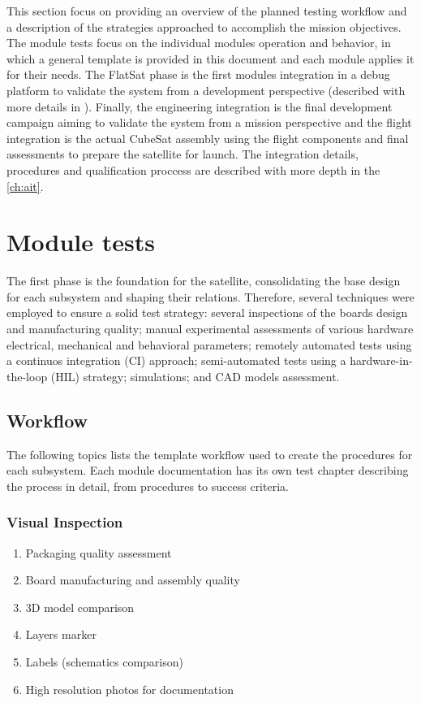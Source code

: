 This section focus on providing an overview of the planned testing workflow and a description of the strategies approached to accomplish the mission objectives. The module tests focus on the individual modules operation and behavior, in which a general template is provided in this document and each module applies it for their needs. The FlatSat phase is the first modules integration in a debug platform to validate the system from a development perspective (described with more details in \cite{flatsat}). Finally, the engineering integration is the final development campaign aiming to validate the system from a mission perspective and the flight integration is the actual CubeSat assembly using the flight components and final assessments to prepare the satellite for launch. The integration details, procedures and qualification proccess are described with more depth in the \autoref{ch:ait}. %

\section{Module tests}

The first phase is the foundation for the satellite, consolidating the base design for each subsystem and shaping their relations. Therefore, several techniques were employed to ensure a solid test strategy: several inspections of the boards design and manufacturing quality; manual experimental assessments of various hardware electrical, mechanical and behavioral parameters; remotely automated tests using a continuos integration (CI) approach; semi-automated tests using a hardware-in-the-loop (HIL) strategy; simulations; and CAD models assessment.

\subsection{Workflow}

The following topics lists the template workflow used to create the procedures for each subsystem. Each module documentation has its own test chapter describing the process in detail, from procedures to success criteria.

\subsubsection{Visual Inspection} 
\begin{enumerate} \setlength\itemsep{-0.3em}
    \item Packaging quality assessment
    \item Board manufacturing and assembly quality
    \item 3D model comparison
    \item Layers marker
    \item Labels (schematics comparison) 
    \item High resolution photos for documentation
\end{enumerate}

